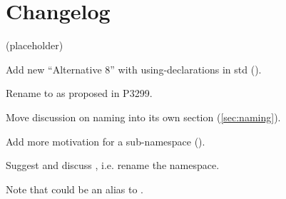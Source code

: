 \section{Changelog}
(placeholder)
\begin{revision}
\item Add new “Alternative 8” with using-declarations in std ().
\item Rename  to  as proposed in P3299.
\item Move discussion on naming into its own section (\ref{sec:naming}).
\item Add more motivation for a sub-namespace ().
\end{revision}

\begin{revision}
\item Suggest and discuss , i.e. rename the namespace.
\item Note that  could be an alias to .
\end{revision}
